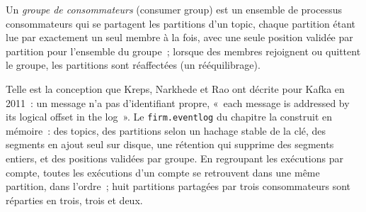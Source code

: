 \begin{definition}\label{def:pl:messaging-and-event-driven-architecture:group}
Un \emph{groupe de consommateurs} (consumer group) est un ensemble de processus consommateurs qui se partagent les partitions d'un topic, chaque partition étant lue par exactement
un seul membre à la fois, avec une seule position validée par partition pour l'ensemble du groupe~; lorsque des membres rejoignent ou quittent le groupe, les partitions sont réaffectées
(un rééquilibrage).
\end{definition}

Telle est la conception que Kreps, Narkhede et Rao ont décrite pour Kafka en 2011~: un message n'a pas d'identifiant propre, «~each message is
addressed by its logical offset in the log~». Le \texttt{firm.eventlog} du chapitre la construit en mémoire~: des topics, des partitions selon un
hachage stable de la clé, des segments en ajout seul sur disque, une rétention qui supprime des segments entiers, et des positions validées par groupe. En regroupant les
exécutions par compte, toutes les exécutions d'un compte se retrouvent dans une même partition, dans l'ordre~; huit partitions partagées par trois consommateurs sont réparties en trois, trois et
deux.

